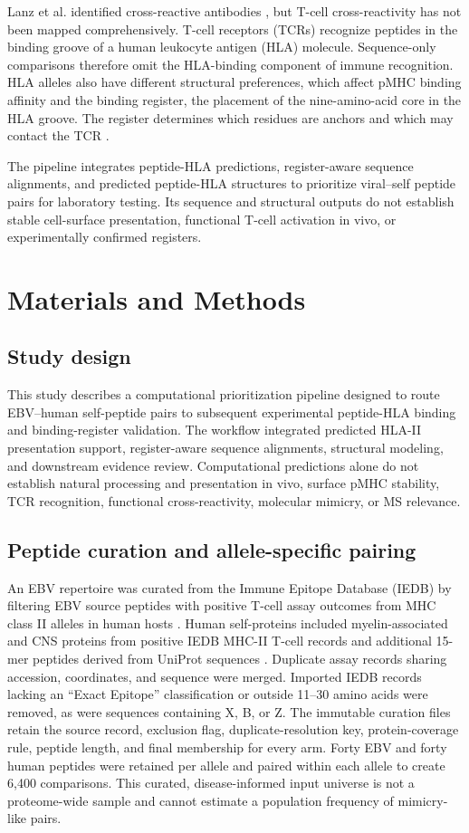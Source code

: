 \documentclass[11pt]{article}
\begin{document}
Lanz et al. identified cross-reactive antibodies \cite{lanz}, but T-cell cross-reactivity has not been mapped comprehensively. T-cell receptors (TCRs) recognize peptides in the binding groove of a human leukocyte antigen (HLA) molecule. Sequence-only comparisons therefore omit the HLA-binding component of immune recognition. HLA alleles also have different structural preferences, which affect pMHC binding affinity and the binding register, the placement of the nine-amino-acid core in the HLA groove. The register determines which residues are anchors and which may contact the TCR \cite{brown,sewell}.

The pipeline integrates peptide-HLA predictions, register-aware sequence alignments, and predicted peptide-HLA structures to prioritize viral--self peptide pairs for laboratory testing. Its sequence and structural outputs do not establish stable cell-surface presentation, functional T-cell activation in vivo, or experimentally confirmed registers.

\section{Materials and Methods}
\subsection{Study design}
This study describes a computational prioritization pipeline designed to route EBV--human self-peptide pairs to subsequent experimental peptide-HLA binding and binding-register validation. The workflow integrated predicted HLA-II presentation support, register-aware sequence alignments, structural modeling, and downstream evidence review. Computational predictions alone do not establish natural processing and presentation in vivo, surface pMHC stability, TCR recognition, functional cross-reactivity, molecular mimicry, or MS relevance.

\subsection{Peptide curation and allele-specific pairing}
An EBV repertoire was curated from the Immune Epitope Database (IEDB) by filtering EBV source peptides with positive T-cell assay outcomes from MHC class II alleles in human hosts \cite{iedb}. Human self-proteins included myelin-associated and CNS proteins from positive IEDB MHC-II T-cell records and additional 15-mer peptides derived from UniProt sequences \cite{uniprot}. Duplicate assay records sharing accession, coordinates, and sequence were merged. Imported IEDB records lacking an ``Exact Epitope'' classification or outside 11--30 amino acids were removed, as were sequences containing X, B, or Z. The immutable curation files retain the source record, exclusion flag, duplicate-resolution key, protein-coverage rule, peptide length, and final membership for every arm. Forty EBV and forty human peptides were retained per allele and paired within each allele to create 6,400 comparisons. This curated, disease-informed input universe is not a proteome-wide sample and cannot estimate a population frequency of mimicry-like pairs.
\end{document}

